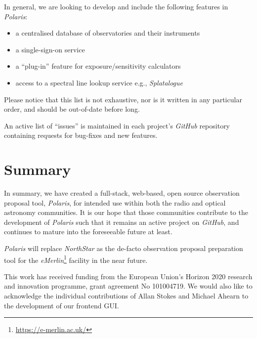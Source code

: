 \documentclass[11pt,twoside]{article}
\begin{document}
In general, we are looking to develop and include the following features in \emph{Polaris}:

\begin{itemize}
    \item a centralised database of observatories and their instruments
    \item a single-sign-on service
    \item a ``plug-in'' feature for exposure/sensitivity calculators
    \item access to a spectral line lookup service e.g., \emph{Splatalogue}
\end{itemize}

Please notice that this list is not exhaustive, nor is it written in any particular order, and should be
out-of-date before long.

An active list of ``issues'' is maintained in each project's \emph{GitHub} repository containing requests for
bug-fixes and new features.

\section{Summary}\label{sec:summary}
In summary, we have created a full-stack, web-based, open source observation proposal tool, \emph{Polaris},
for intended use within both the radio and optical astronomy communities.
It is our hope that those communities contribute to the development of \emph{Polaris} such that it remains an
active project on \emph{GitHub}, and continues to mature into the foreseeable future at least.

\emph{Polaris} will replace \emph{NorthStar} as the de-facto observation proposal preparation tool for
the \emph{eMerlin}\footnote{\url{https://e-merlin.ac.uk/}} facility in the near future.

\acknowledgements This work has received funding from the European Union's Horizon 2020 research and innovation
programme, grant agreement No 101004719.
We would also like to acknowledge the individual contributions of Allan Stokes and Michael Ahearn to the
development of our frontend GUI\@.


\end{document}
